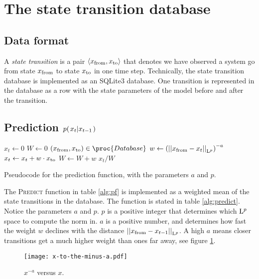 \section{The state transition database}

\subsection{Data format}
A \emph{state transition} is a pair $\trans$ that denotes we have
observed a system go from state $\tf$ to state $\tt$ in one time
step. Technically, the state transition database is implemented as an
SQLite3 database. One transition is represented in the database as a
row with the state parameters of the model before and after the
transition.

\subsection{Prediction $\cprobnext{x}$}

\begin{table}[h]
  \begin{codebox}
    \li $ x_t \gets 0$
    \li $ W \gets 0$
    \li \ForEach $(\tf, \tt) \in \proc{Database}$
    \li \Do
      \li $ w \gets \left(\Lpnorm[p]{\tf - x_t}\right)^{-a}$
      \li $ x_t \gets x_t + w \cdot \tt$
      \li $ W \gets W + w$
    \End
    \li \Return $x_t / W$
  \end{codebox}
  \caption{Pseudocode for the prediction function, with the parameters $a$ and $p$.}
  \label{alg:predict}
\end{table}

The \textsc{Predict} function in table \ref{alg:pf} is implemented as a weighted mean of the
state transitions in the database. The function is stated in table
\ref{alg:predict}. Notice the parameters $a$ and $p$. $p$ is a
positive integer that determines which $\Lp$ space to compute the norm
in. $a$ is a positive number, and determines how fast the weight $w$
declines with the distance $\Lpnorm[p]{\tf - x_{t-1}}$. A high $a$
means closer transitions get a much higher weight than ones far away,
see figure \ref{fig:x-to-the-minus-a}.

\begin{figure}
  \centering
  \texttt{[image: x-to-the-minus-a.pdf]}
  \caption{$x^{-a}$ versus $x$.}
  \label{fig:x-to-the-minus-a}
\end{figure}




